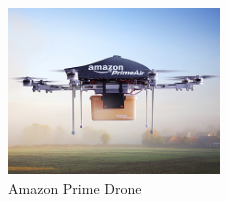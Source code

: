 \documentclass[conference]{IEEEtran}
\begin{document}
%



\begin{figure}[!t]
\centering
\includegraphics[width=0.5\textwidth]{Developing_Delivery_Drones_hero}
\caption{Amazon Prime Drone}
\label{fig_amazon_prime_drone}
\end{figure}
\end{document}
